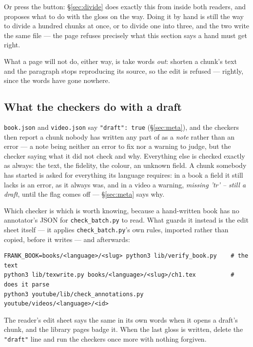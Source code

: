 \documentclass[11pt,oneside]{report}
\newcommand{\file}[1]{\texttt{#1}}
\begin{document}
Or press the button: \S\ref{sec:divide} does exactly this from inside both
readers, and proposes what to do with the gloss on the way. Doing it by hand
is still the way to divide a hundred chunks at once, or to divide one into
three, and the two write the same file --- the page refuses precisely what
this section says a hand must get right.

What a page will not do, either way, is take words \emph{out}: shorten a
chunk's text and the paragraph stops reproducing its source, so the edit is
refused --- rightly, since the words have gone nowhere.

\subsection*{What the checkers do with a draft}

\file{book.json} and \file{video.json} say \texttt{"draft": true}
(\S\ref{sec:meta}), and the checkers then report a chunk nobody has written
any part of as a \emph{note} rather than an error --- a note being neither an
error to fix nor a warning to judge, but the checker saying what it did not
check and why. Everything else is checked exactly as always: the text, the
fidelity, the colour, an unknown field. A chunk somebody has started is
asked for everything its language requires: in a book a field it still lacks
is an error, as it always was, and in a video a warning, \emph{missing 'tr'
-- still a draft}, until the flag comes off --- \S\ref{sec:meta} says why.

Which checker is which is worth knowing, because a hand-written book has no
annotator's JSON for \file{check\_batch.py} to read. What guards it instead
is the edit sheet itself --- it applies \file{check\_batch.py}'s own rules,
imported rather than copied, before it writes --- and afterwards:

\begin{lstlisting}
FRANK_BOOK=books/<language>/<slug> python3 lib/verify_book.py    # the text
python3 lib/texwrite.py books/<language>/<slug>/ch1.tex          # does it parse
python3 youtube/lib/check_annotations.py youtube/videos/<language>/<id>
\end{lstlisting}

\noindent The reader's edit sheet says the same in its own words when it opens
a draft's chunk, and the library pages badge it. When the last gloss is
written, delete the \texttt{"draft"} line and run the checkers once more with
nothing forgiven.
\end{document}
